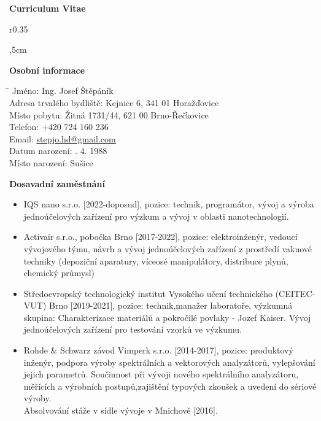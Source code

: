 \documentclass[12pt]{article}
\begin{document}
\begin{center}
\textbf{\LARGE Curriculum Vitae} \\
\end{center}

\begin{wrapfigure}{r}{0.35\textwidth}
\vspace{-1cm}
\end{wrapfigure}



,5cm

\textbf{Osobní informace} 
\begin{tabbing}
    \hspace{6cm}\= \kill
    Jméno: \> Ing. Josef Štěpáník \\
    Adresa trvalého bydliště: \> Kejnice 6, 341 01 Horažďovice \\
    Místo pobytu: \> Žitná 1731/44, 621 00 Brno-Řečkovice \\
    Telefon: \> +420 724 160 236 \\
    Email: \> \href{mailto:stepjo.hd@gmail.com}{stepjo.hd@gmail.com} \\
    Datum narození: . 4. 1988 \\
    Místo narození: \> Sušice \\
\end{tabbing}
\vskip 1cm


\textbf{Dosavadní zaměstnání}

\begin{itemize}
\item IQS nano s.r.o. [2022-doposud], pozice: technik, programátor, vývoj a výroba jednoúčelových zařízení pro výzkum a vývoj v oblasti nanotechnologií.


\item Activair s.r.o., pobočka Brno [2017-2022], pozice: elektroinženýr, vedoucí vývojového týmu, návrh a vývoj jednoúčelových zařízení z prostředí vakuové techniky (depoziční aparatury, víceosé manipulátory, distribuce plynů, chemický průmysl) 

\item 
Středoevropský technologický institut Vysokého učení technického 
(CEITEC-VUT) Brno [2019-2021], pozice: technik,manažer laboratoře,  výzkumná skupina: Charakterizace materiálů a pokročilé povlaky - Jozef Kaiser. 
Vývoj jednoúčelových zařízení pro testování vzorků ve výzkumu. 

\item Rohde \& Schwarz závod Vimperk s.r.o. [2014-2017], pozice: produktový inženýr, podpora výroby spektrálních a vektorových analyzátorů, vylepšování jejich parametrů. Součinnost při vývoji nového spektrálního analyzátoru, měřících a výrobních postupů,zajištění typových zkoušek a uvedení do sériové výroby. \\
Absolvování stáže v sídle vývoje v Mnichově [2016].
 
\end{itemize}
\end{document}
